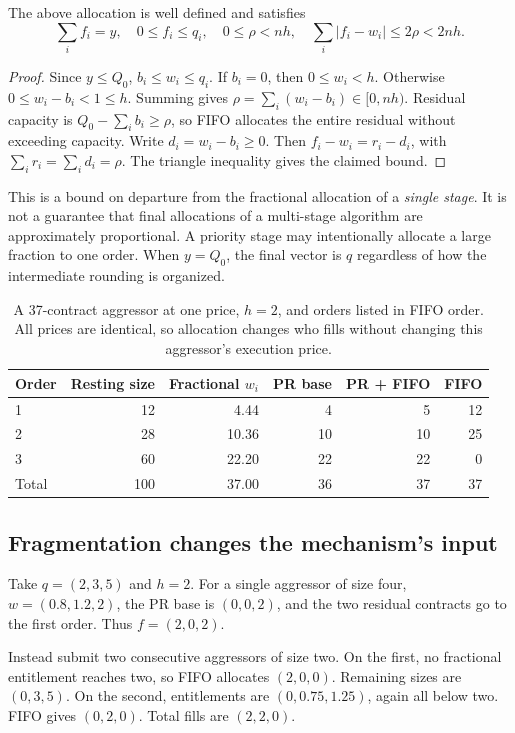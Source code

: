 \begin{proposition}\label{prop:rounding}
The above allocation is well defined and satisfies
\begin{equation}
 \sum_i f_i=y,\quad 0\le f_i\le q_i,\quad
 0\le\rho<nh,\quad
 \sum_i|f_i-w_i|\le2\rho<2nh.
\end{equation}
\end{proposition}
\begin{proof}
Since $y\le Q_0$, $b_i\le w_i\le q_i$. If $b_i=0$, then $0\le w_i<h$. Otherwise $0\le w_i-b_i<1\le h$. Summing gives $\rho=\sum_i(w_i-b_i)\in[0,nh)$. Residual capacity is $Q_0-\sum_i b_i\ge\rho$, so FIFO allocates the entire residual without exceeding capacity. Write $d_i=w_i-b_i\ge0$. Then $f_i-w_i=r_i-d_i$, with $\sum_i r_i=\sum_i d_i=\rho$. The triangle inequality gives the claimed bound.
\end{proof}

This is a bound on departure from the fractional allocation of a \emph{single stage}. It is not a guarantee that final allocations of a multi-stage algorithm are approximately proportional. A priority stage may intentionally allocate a large fraction to one order. When $y=Q_0$, the final vector is $q$ regardless of how the intermediate rounding is organized.

\begin{table}[htbp]
\centering
\begin{tabular}{@{}lrrrrr@{}}
\toprule
Order & Resting size & Fractional $w_i$ & PR base & PR + FIFO & FIFO\\
\midrule
1 & 12 & 4.44 & 4 & 5 & 12\\
2 & 28 & 10.36 & 10 & 10 & 25\\
3 & 60 & 22.20 & 22 & 22 & 0\\
\midrule
Total & 100 & 37.00 & 36 & 37 & 37\\
\bottomrule
\end{tabular}
\caption{A 37-contract aggressor at one price, $h=2$, and orders listed in FIFO order. All prices are identical, so allocation changes who fills without changing this aggressor's execution price.}
\label{tab:allocation}
\end{table}

\subsection{Fragmentation changes the mechanism's input}

\begin{example}\label{ex:fragment}
Take $q=(2,3,5)$ and $h=2$. For a single aggressor of size four, $w=(0.8,1.2,2)$, the PR base is $(0,0,2)$, and the two residual contracts go to the first order. Thus $f=(2,0,2)$.

Instead submit two consecutive aggressors of size two. On the first, no fractional entitlement reaches two, so FIFO allocates $(2,0,0)$. Remaining sizes are $(0,3,5)$. On the second, entitlements are $(0,0.75,1.25)$, again all below two. FIFO gives $(0,2,0)$. Total fills are $(2,2,0)$.
\end{example}

